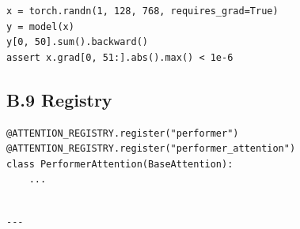 \begin{lstlisting}
x = torch.randn(1, 128, 768, requires_grad=True)
y = model(x)
y[0, 50].sum().backward()
assert x.grad[0, 51:].abs().max() < 1e-6
\end{lstlisting}

\subsection{B.9 Registry}

\begin{lstlisting}
@ATTENTION_REGISTRY.register("performer")
@ATTENTION_REGISTRY.register("performer_attention")
class PerformerAttention(BaseAttention):
    ...
\end{lstlisting}
\begin{lstlisting}

---
\end{lstlisting}